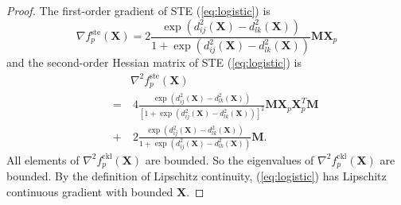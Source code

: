 \documentclass[./sbb_ordinal_embedding_aaai18.tex]{subfiles}%
\begin{document}
\begin{proof}
		The first-order gradient of STE (\ref{eq:logistic}) is
		\begin{equation}
		\nabla f^{\text{ste}}_p(\mathbf{X})=
		2\frac{\exp(d^2_{ij}(\mathbf{X})-d^2_{lk}(\mathbf{X}))}{1+\exp(d^2_{ij}(\mathbf{X})-d^2_{lk}(\mathbf{X}))}\mathbf{MX}_p
		\end{equation}
		and the second-order Hessian matrix of STE (\ref{eq:logistic}) is
		\begin{equation}
		\begin{aligned}
		& & & \nabla^2 f^{\text{ste}}_p(\mathbf{X})\\
		& &=&\ 4\frac{\exp(d^2_{ij}(\mathbf{X})-d^2_{lk}(\mathbf{X}))}{[1+\exp(d^2_{ij}(\mathbf{X})-d^2_{lk}(\mathbf{X}))]^2}\mathbf{MX}_p\mathbf{X}^T_p\mathbf{M}\\
		& &+&\ 2\frac{\exp(d^2_{ij}(\mathbf{X})-d^2_{lk}(\mathbf{X}))}{1+\exp(d^2_{ij}(\mathbf{X})-d^2_{lk}(\mathbf{X}))}\mathbf{M}.
		\end{aligned}
		\end{equation}
		All elements of $\nabla^2 f^{\text{ckl}}_p(\mathbf{X})$ are bounded. So the eigenvalues of $\nabla^2 f^{\text{ckl}}_p(\mathbf{X})$ are bounded. By the definition of Lipschitz continuity, (\ref{eq:logistic}) has Lipschitz continuous gradient with bounded $\mathbf{X}$.
		

\end{proof}
\end{document}
